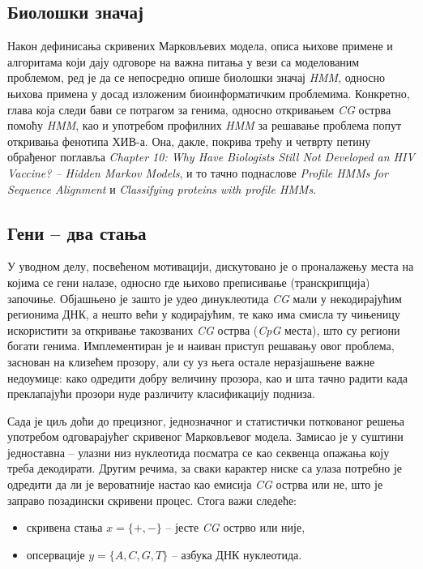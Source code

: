 \documentclass[12pt,oneside]{memoir}
\begin{document}
\begin{CJK}{UTF8}{ipxm}
\chapter{Биолошки значај}
Након дефинисања скривених Марковљевих модела, описа њихове примене и алгоритама који дају одговоре на важна питања у вези са моделованим проблемом, ред је да се непосредно опише биолошки значај \textit{HMM}, односно њихова примена у досад изложеним биоинформатичким проблемима. Конкретно, глава која следи бави се потрагом за генима, односно откривањем \textit{CG} острва помоћу \textit{HMM}, као и употребом профилних \textit{HMM} за решавање проблема попут откривања фенотипа ХИВ-а. Она, дакле, покрива трећу и четврту петину обрађеног поглавља \textit{Chapter 10: Why Have Biologists Still Not Developed an HIV Vaccine? -- Hidden Markov Models}, и то тачно поднаслове \textit{Profile HMMs for Sequence Alignment} и \textit{Classifying proteins with profile HMMs}.

\section{Гени -- два стања}
У уводном делу, посвећеном мотивацији, дискутовано је о проналажењу места на којима се гени налазе, односно где њихово преписивање (транскрипција) започиње. Објашњено је зашто је удео динуклеотида \textit{CG} мали у некодирајућим регионима ДНК, а нешто већи у кодирајућим, те како има смисла ту чињеницу искористити за откривање такозваних \textit{CG} острва (\textit{CpG} места), што су региони богати генима. Имплементиран је и наиван приступ решавању овог проблема, заснован на клизећем прозору, али су уз њега остале неразјашњене важне недоумице: како одредити добру величину прозора, као и шта тачно радити када преклапајући прозори нуде различиту класификацију подниза.

Сада је циљ доћи до прецизног, једнозначног и статистички поткованог решења употребом одговарајућег скривеног Марковљевог модела. Замисао је у суштини једноставна -- улазни низ нуклеотида посматра се као секвенца опажања коју треба декодирати. Другим речима, за сваки карактер ниске са улаза потребно је одредити да ли је вероватније настао као емисија \textit{CG} острва или не, што је заправо позадински скривени процес. Стога важи следеће:
\begin{itemize}
  \item скривена стања $x = \{+, -\}$ -- јесте \textit{CG} острво или није,
  \item опсервације $y = \{A, C, G, T\}$ -- азбука ДНК нуклеотида.
\end{itemize}


\end{CJK}
\end{document}
